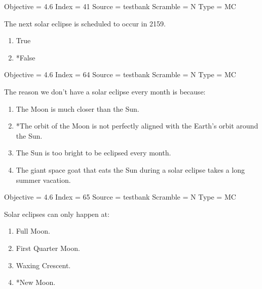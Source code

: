 \documentclass[11pt]{article}
\begin{document}
\begin{enumerate}
\begin{minipage}{\textwidth}
\begin{minipage}{\textwidth}
Objective = 4.6
Index = 41
Source = testbank
Scramble = N
Type = MC
\end{minipage}
\end{minipage}
\vskip 0.20in

\begin{minipage}{\textwidth}
\begin{minipage}{\textwidth}
\item The next solar eclipse is scheduled to occur in 2159.
\begin{multicols}{3}
\begin{enumerate} 
\setlength{\itemsep}{1pt} 
\setlength{\parskip}{0pt} 
\setlength{\parsep}{0pt}
\setlength{\multicolsep}{1pt} 
\item True
\item *False
\end{enumerate} 
\vfill 
\end{multicols}

Objective = 4.6
Index = 64
Source = testbank
Scramble = N
Type = MC
\end{minipage}
\end{minipage}
\vskip 0.20in

\begin{minipage}{\textwidth}
\begin{minipage}{\textwidth}
\item The reason we don't have a solar eclipse every month is because:
\begin{enumerate} 
\setlength{\itemsep}{1pt} 
\setlength{\parskip}{0pt} 
\setlength{\parsep}{0pt}
\setlength{\multicolsep}{1pt} 
\item The Moon is much closer than the Sun.
\item *The orbit of the Moon is not perfectly aligned with the Earth's orbit around the Sun.
\item The Sun is too bright to be eclipsed every month.
\item The giant space goat that eats the Sun during a solar eclipse takes a long summer vacation.
\end{enumerate} 
Objective = 4.6
Index = 65
Source = testbank
Scramble = N
Type = MC
\end{minipage}
\end{minipage}
\vskip 0.20in

\begin{minipage}{\textwidth}
\begin{minipage}{\textwidth}
\item Solar eclipses can only happen at:
\begin{multicols}{3}
\begin{enumerate} 
\setlength{\itemsep}{1pt} 
\setlength{\parskip}{0pt} 
\setlength{\parsep}{0pt}
\setlength{\multicolsep}{1pt} 
\item Full Moon.
\item First Quarter Moon.
\item Waxing Crescent.
\item *New Moon.
\end{enumerate} 
\vfill 
\end{multicols}


\end{minipage}
\end{minipage}
\end{enumerate}
\end{document}
